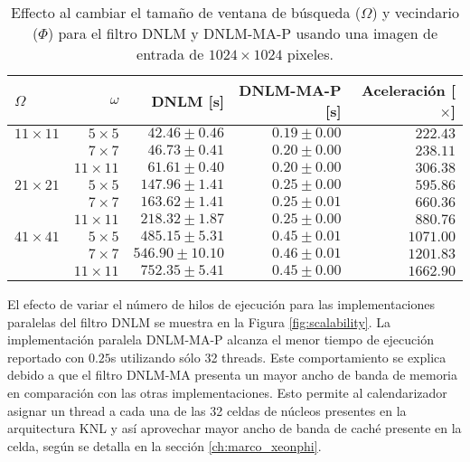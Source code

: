 \begin{table}
\protect\caption[Efecto al cambiar parámetros $\Omega$ y $\Phi$]{Effecto al cambiar el tama\~no de ventana de búsqueda ($\Omega$) y vecindario ($\Phi$) para el filtro DNLM y DNLM-MA-P usando una imagen de entrada de  $1024 \times 1024$ pixeles. \label{tabla:scala2}}
\centering
\begin{tabular}{lrrrr}
$\Omega$  & $\omega$ & DNLM [s]& DNLM-MA-P [s]& Aceleración [$\times$]\tabularnewline
\hline
$11 \times 11$ & $5 \times 5$ & $42.46\pm0.46$ & $0.19\pm0.00$ & $222.43$ \tabularnewline
 & $7 \times 7$ & $46.73\pm0.41$ & $0.20\pm0.00$ & $238.11$ \tabularnewline
 & $11 \times 11$ & $61.61\pm0.40$ & $0.20\pm0.00$ & $306.38$ \tabularnewline
$21 \times 21$ & $5 \times 5$ & $147.96\pm1.41$ & $0.25\pm0.00$ & $595.86$ \tabularnewline
 & $7 \times 7$ & $163.62\pm1.41$ & $0.25\pm0.01$ & $660.36$ \tabularnewline
 & $11 \times 11$ & $218.32\pm1.87$ & $0.25\pm0.00$ & $880.76$ \tabularnewline
 $41 \times 41$ & $5 \times 5$ & $485.15\pm5.31$ & $0.45\pm0.01$ & $1071.00$ \tabularnewline
 & $7 \times 7$ & $546.90\pm10.10$ & $0.46\pm0.01$ & $1201.83$ \tabularnewline
 & $11 \times 11$ & $752.35\pm5.41$ & $0.45\pm0.00$ & $1662.90$ \tabularnewline
\end{tabular}
\end{table}




El efecto de variar el número de hilos de ejecución para las implementaciones paralelas del filtro DNLM se muestra en la Figura \ref{fig:scalability}. La implementación paralela DNLM-MA-P alcanza el menor tiempo de ejecución reportado con $0.25$s utilizando sólo 32 threads. Este comportamiento se explica debido a que el filtro DNLM-MA presenta un mayor ancho de banda de memoria en comparación con las otras implementaciones. Esto permite al calendarizador asignar un thread a cada una de las 32 celdas de núcleos presentes en la arquitectura  KNL y así aprovechar mayor ancho de banda de caché presente en la celda, según se detalla en la sección \ref{ch:marco_xeonphi}. 







